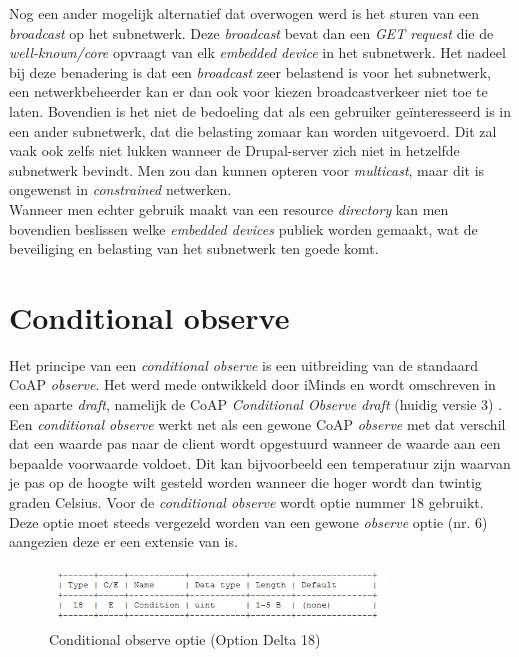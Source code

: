 Nog een ander mogelijk alternatief dat overwogen werd is het sturen van een \textit{broadcast} op het subnetwerk. Deze \textit{broadcast} bevat dan een \textit{GET request} die de \textit{well-known/core} opvraagt van elk \textit{embedded device} in het subnetwerk. Het nadeel bij deze benadering is dat een \textit{broadcast} zeer belastend is voor het subnetwerk, een netwerkbeheerder kan er dan ook voor kiezen broadcastverkeer niet toe te laten. Bovendien is het niet de bedoeling dat als een gebruiker ge\"{i}nteresseerd is in een ander subnetwerk, dat die belasting zomaar kan worden uitgevoerd. Dit zal vaak ook zelfs niet lukken wanneer de Drupal-server zich niet in hetzelfde subnetwerk bevindt. Men zou dan kunnen opteren voor \textit{multicast}, maar dit is ongewenst in \textit{constrained} netwerken.\\
Wanneer men echter gebruik maakt van een resource \textit{directory} kan men bovendien beslissen welke \textit{embedded devices} publiek worden gemaakt, wat de beveiliging en belasting van het subnetwerk ten goede komt.

\section{Conditional observe}

Het principe van een \textit{conditional observe} is een uitbreiding van de standaard CoAP \textit{observe}. Het werd mede ontwikkeld door iMinds en wordt omschreven in een aparte \textit{draft}, namelijk de CoAP \textit{Conditional Observe draft} (huidig versie 3) \cite{coapConditionalObserveDraft}.\\

Een \textit{conditional observe} werkt net als een gewone CoAP \textit{observe} met dat verschil dat een waarde pas naar de client wordt opgestuurd wanneer de waarde aan een bepaalde voorwaarde voldoet. Dit kan bijvoorbeeld een temperatuur zijn waarvan je pas op de hoogte wilt gesteld worden wanneer die hoger wordt dan twintig graden Celsius.
Voor de \textit{conditional observe} wordt optie nummer 18 gebruikt. Deze optie moet steeds vergezeld worden van een gewone \textit{observe} optie (nr. 6) aangezien deze er een extensie van is.

\begin{figure}[h!]
\centering
\includegraphics[width=0.8\textwidth]{fig/conditional}
\caption{Conditional observe optie (Option Delta 18)}
\end{figure}

